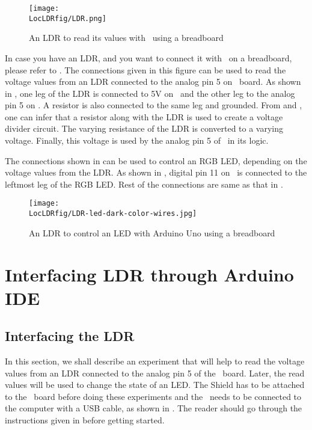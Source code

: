 \begin{figure}
  \centering
  \texttt{[image: \\LocLDRfig/LDR.png]}
  \caption{An LDR to read its values with \arduino\ using a breadboard}
  \label{fig:ard-ldr}
\end{figure}

In case you have an LDR, and you want to connect it with \arduino\ on a breadboard, 
please refer to . The connections given in this figure can be 
used to read the voltage values from an LDR connected to the analog pin 5 on 
\arduino\ board. As shown in , one leg of the LDR is connected 
to 5V on \arduino\ and the other leg to the analog pin 5 on \arduino. A resistor is also connected to the same leg and grounded. 
From  and , one can infer that a resistor 
along with the LDR is used to create a voltage divider circuit. The varying 
resistance of the LDR is converted to a varying voltage. Finally, this voltage is used 
by the analog pin 5 of \arduino\ in its logic. 

The connections shown in  can be used to control an RGB LED, 
depending on the voltage values from the LDR. As shown in , 
digital pin 11 on \arduino\ is connected to the leftmost leg of the RGB LED. Rest of the connections
are same as that in . 

\begin{figure}
  \centering
  \texttt{[image: \\LocLDRfig/LDR-led-dark-color-wires.jpg]}
  \caption{An LDR to control an LED with Arduino Uno using a breadboard}
  \label{fig:ard-ldr-led}
\end{figure}


\section{Interfacing LDR through Arduino IDE}
\subsection{Interfacing the LDR}
In this section, we shall describe an experiment that will help 
to read the voltage values from an LDR connected to the analog pin 5 
of the \arduino\ board. Later, the read values will be used to change the state of an LED.  The Shield has to be attached to the \arduino\ board
before doing these experiments and the \arduino\ needs to be connected to the computer 
with a USB cable, as shown in . The reader should go through the
instructions given in  before getting started.

